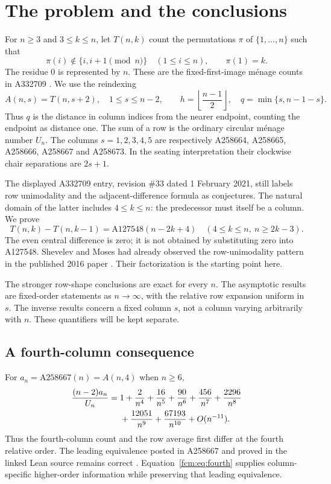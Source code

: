 \documentclass[11pt,letterpaper]{article}
\theoremstyle{remark}\newtheorem{remark}[theorem]{Remark}
\begin{document}
\section{The problem and the conclusions}
For $n\ge3$ and $3\le k\le n$, let $T(n,k)$ count the permutations $\pi$ of $\{1,\ldots,n\}$ such that
\[
 \pi(i)\notin\{i,i+1\pmod n\}\quad(1\le i\le n),\qquad \pi(1)=k.
\]
The residue $0$ is represented by $n$. These are the fixed-first-image m\'enage counts in A332709 \cite{oeis332709}. We use the reindexing
\begin{equation}\label{fcm:eq:notation}
 A(n,s)=T(n,s+2),\quad 1\le s\le n-2,\qquad
 h=\left\lfloor\frac{n-1}{2}\right\rfloor,\quad q=\min\{s,n-1-s\}.
\end{equation}
Thus $q$ is the distance in column indices from the nearer endpoint, counting the endpoint as distance one. The sum of a row is the ordinary circular m\'enage number $U_n$. The columns $s=1,2,3,4,5$ are respectively A258664, A258665, A258666, A258667 and A258673. In the seating interpretation their clockwise chair separations are $2s+1$.

The displayed A332709 entry, revision \#33 dated 1 February 2021, still labels row unimodality and the adjacent-difference formula as conjectures. The natural domain of the latter includes $4\le k\le n$: the predecessor must itself be a column. We prove
\[
 T(n,k)-T(n,k-1)=\mathrm{A127548}(n-2k+4)
 \quad(4\le k\le n,\ n\ge2k-3).
\]
The even central difference is zero; it is not obtained by substituting zero into A127548. Shevelev and Moses had already observed the row-unimodality pattern in the published 2016 paper \cite{sm}. Their factorization is the starting point here.

The stronger row-shape conclusions are exact for every $n$. The asymptotic results are fixed-order statements as $n\to\infty$, with the relative row expansion uniform in $s$. The inverse results concern a fixed column $s$, not a column varying arbitrarily with $n$. These quantifiers will be kept separate.

\subsection{A fourth-column consequence}
For $a_n=\mathrm{A258667}(n)=A(n,4)$ when $n\ge6$,
\begin{align}\label{fcm:eq:fourth}
 \frac{(n-2)a_n}{U_n}={}&1+\frac2{n^4}+\frac{16}{n^5}+\frac{90}{n^6}
 +\frac{456}{n^7}+\frac{2296}{n^8}\notag\\
 &+\frac{12051}{n^9}+\frac{67193}{n^{10}}+O(n^{-11}).
\end{align}
Thus the fourth-column count and the row average first differ at the fourth relative order. The leading equivalence posted in A258667 and proved in the linked Lean source remains correct \cite{oeis258667,lean}. Equation~\eqref{fcm:eq:fourth} supplies column-specific higher-order information while preserving that leading equivalence.
\end{document}
